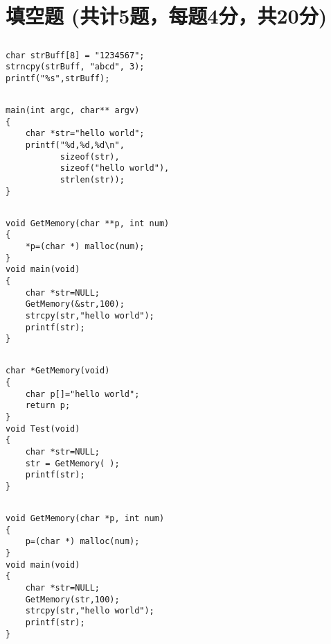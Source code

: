 ﻿\documentclass  [11pt,twocolumn]{article}
\begin{document}
\blankline{1ex}
\section{填空题 (共计5题，每题4分，共20分)}

\subsection{\fillblank}
\begin{lstlisting}
char strBuff[8] = "1234567";
strncpy(strBuff, "abcd", 3);
printf("%s",strBuff);
\end{lstlisting}

\subsection{\fillblank}
\begin{lstlisting}
main(int argc, char** argv)
{
    char *str="hello world";
    printf("%d,%d,%d\n",
           sizeof(str),
           sizeof("hello world"),
           strlen(str));
}
\end{lstlisting}

\subsection{\fillblank}
\begin{lstlisting}
void GetMemory(char **p, int num) 
{ 
    *p=(char *) malloc(num); 
} 
void main(void) 
{ 
    char *str=NULL; 
    GetMemory(&str,100);
    strcpy(str,"hello world");
    printf(str); 
} 
\end{lstlisting}

\subsection{\fillblank}
\begin{lstlisting}
char *GetMemory(void) 
{ 
    char p[]="hello world"; 
    return p; 
} 
void Test(void) 
{ 
    char *str=NULL; 
    str = GetMemory( );
    printf(str); 
} 
\end{lstlisting}

\subsection{\fillblank}
\begin{lstlisting}
void GetMemory(char *p, int num) 
{ 
    p=(char *) malloc(num); 
} 
void main(void) 
{ 
    char *str=NULL; 
    GetMemory(str,100); 
    strcpy(str,"hello world"); 
    printf(str); 
} 
\end{lstlisting}
\end{document}
